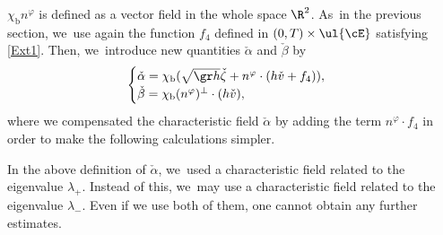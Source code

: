 $\chi_\mathrm{b}n^\varphi$ is defined as a vector field in the whole space $\R^2$. As~in the previous section, we~use again the function $f_4$ defined in $(0,T)\times\ul{\cE}$ satisfying \eqref{Ext1}.
Then, we~introduce new quantities $\check{\alpha}$ and $\check{\beta}$ by
\begin{equation}\label{defCF}
\begin{cases}
\check{\alpha}=\chi_\mathrm{b}(\sqrt{\gr h}\check{\zeta} + n^\varphi\cdot(h\check{v}+f_4)), \\
\check{\beta}=\chi_\mathrm{b}(n^\varphi)^\perp\cdot(h\check{v}),
\end{cases}
\end{equation}
where we compensated the characteristic field $\check{\alpha}$ by adding the term $n^\varphi\cdot f_4$ in order to make the following calculations simpler.

\begin{remark}
In the above definition of $\check{\alpha}$, we~used a characteristic field related to the eigenvalue $\lambda_+$.
Instead of this, we~may use a characteristic field related to the eigenvalue $\lambda_-$.
Even if we use both of them, one cannot obtain any further estimates.
\end{remark}

